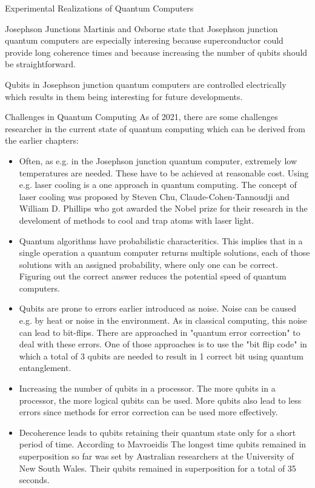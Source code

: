 \documentclass[aps,preprintnumbers,twocolumn]{revtex4}
\begin{document}
\begin{section}{Experimental Realizations of Quantum Computers}
\begin{subsection}{Josephson Junctions}
Martinis and Osborne state \cite{martinis} that Josephson junction quantum computers are especially interesing because superconductor could provide long coherence times and because increasing the number of qubits should be straightforward. 

Qubits in Josephson junction quantum computers are controlled electrically which results in them being interesting for future developments.
\end{subsection}

\begin{section}{Challenges in Quantum Computing}
As of 2021, there are some challenges researcher in the current state of quantum computing which can be derived from the earlier chapters: 

\begin{itemize}
    \item Often, as e.g. in the Josephson junction quantum computer, extremely low temperatures are needed. These have to be achieved at reasonable cost. Using e.g. laser cooling is a one approach in quantum computing. The concept of laser cooling was proposed by Steven Chu, Claude-Cohen-Tannoudji and William D. Phillips who got awarded the Nobel prize for their research in the develoment of methods to cool and trap atoms with laser light.
    \item Quantum algorithms have probabilistic characteritics. 
    This implies that in a single operation a quantum computer returns multiple solutions, each of those solutions with an assigned probability, where only one can be correct. 
    Figuring out the correct answer reduces the potential speed of quantum computers.
    \item Qubits are prone to errors earlier introduced as noise. 
    Noise can be caused e.g. by heat or noise in the environment. 
    As in classical computing, this noise can lead to bit-flips. There are approached in "quantum error correction" to deal with these errors. 
    One of those approaches is to use the "bit flip code" in which a total of 3 qubits are needed to result in 1 correct bit using quantum entanglement.  
    \item Increasing the number of qubits in a processor. The more qubits in a processor, the more logical qubits can be used. More qubits also lead to less errors since methods for error correction can be used more effectively.
    \item Decoherence leads to qubits retaining their quantum state only for a short period of time. 
    According to Mavroeidis \cite{DBLP:journals/corr/abs-1804-00200} The longest time qubits remained in superposition so far was set by Australian researchers at the University of New South Wales. 
    Their qubits remained in superposition for a total of 35 seconds.
\end{itemize}

\end{section}

\end{section}
\end{document}

